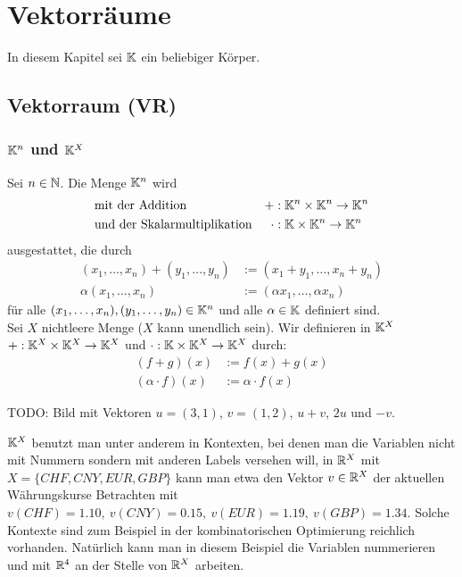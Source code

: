 \section{Vektorräume}
In diesem Kapitel sei $ \mathbb K $ ein beliebiger Körper.

\subsection{Vektorraum (VR)}
\subsubsection{$ \mathbb K^n $ und $ \mathbb K^X $}
Sei $ n \in \mathbb N $. Die Menge $ \mathbb K^n $ wird
\begin{align*}
	& \text{mit der Addition} & + &: \mathbb K^n \times \mathbb K^n \to \mathbb K^n\\
	& \text{und der Skalarmultiplikation} & \cdot &: \mathbb K \times \mathbb K^n \to \mathbb K^n
\end{align*}
ausgestattet, die durch 
\begin{align*}
	(x_1, \ldots, x_n) + (y_1, \ldots, y_n) &:= (x_1+y_1, \ldots, x_n+y_n)\\
	\alpha (x_1, \ldots, x_n) &:= (\alpha x_1, \ldots,\alpha x_n)
\end{align*}
für alle $ (x_1, \ldots, x_n), (y_1, \ldots, y_n) \in \mathbb K^n $ und alle $ \alpha \in \mathbb K $ definiert sind.\\[10pt]
Sei $ X $ nichtleere Menge ($ X $ kann unendlich sein). %
Wir definieren in $ \mathbb K^X $ $ + : \mathbb K^X \times \mathbb K^X \to \mathbb K^X $ und $ \cdot : \mathbb K \times \mathbb K^X \to \mathbb K^X $ durch:
\begin{align*}
	(f+g)(x) &:= f(x) + g(x) \\
	(\alpha \cdot f) (x) &:= \alpha \cdot f(x)
\end{align*}

TODO: Bild mit Vektoren $u=(3,1)$, $v=(1,2)$, $u+v$, $2 u$ und $-v$. 

\begin{bsp} 
$\mathbb K^X$ benutzt man unter anderem in Kontexten, bei denen man die Variablen nicht mit Nummern sondern mit anderen Labels versehen will, in $\mathbb R^X$ mit $X = \{ CHF, CNY, EUR, GBP \}$ kann man etwa den Vektor $v \in \mathbb R^X$ der aktuellen Währungskurse Betrachten mit $v(CHF)=1{.}10, \ v(CNY)=0{.}15, \ v(EUR) = 1{.}19, \ v(GBP) = 1{.}34$. Solche Kontexte sind zum Beispiel in der kombinatorischen Optimierung reichlich vorhanden. Natürlich kann man in diesem Beispiel die Variablen nummerieren und mit $\mathbb R^4$ an der Stelle von $\mathbb R^X$ arbeiten. 
\end{bsp} 

